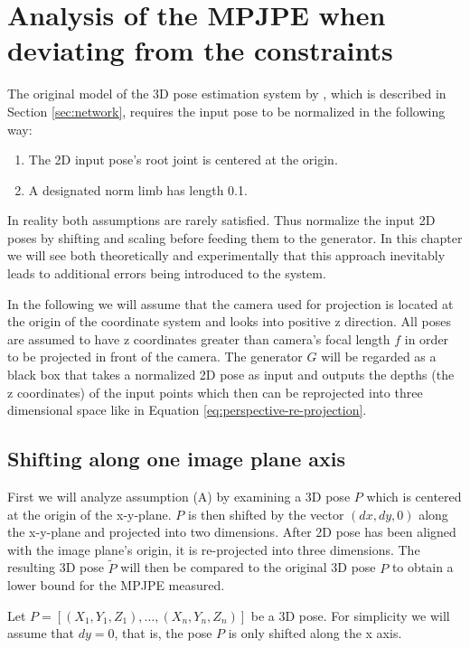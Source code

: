 \section{Analysis of the MPJPE when deviating from the constraints}

The original model of the 3D pose estimation system by \citet{drover18}, which is described in Section \ref{sec:network}, requires the input pose to be normalized in the following way:
\begin{enumerate}[label=(\Alph*)]
	\item The 2D input pose's root joint is centered at the origin.
	\item A designated norm limb has length 0.1.
\end{enumerate}

In reality both assumptions are rarely satisfied.
Thus \citet{drover18} normalize the input 2D poses by shifting and scaling before feeding them to the generator.
In this chapter we will see both theoretically and experimentally that this approach inevitably leads to additional errors being introduced to the system.


In the following we will assume that the camera used for projection is located at the origin of the coordinate system and looks into positive z direction.
All poses are assumed to have z coordinates greater than camera's focal length $f$ in order to be projected in front of the camera.
The generator $G$ will be regarded as a black box that takes a normalized 2D pose as input and outputs the depths (the z coordinates) of the input points which then can be reprojected into three dimensional space like in Equation \eqref{eq:perspective-re-projection}.

\subsection{Shifting along one image plane axis}
\label{sec:x-shift-error}
First we will analyze assumption (A) by examining a 3D pose $P$ which is centered at the origin of the x-y-plane.
$P$ is then shifted by the vector $(dx, dy, 0)$ along the x-y-plane and projected into two dimensions.
After 2D pose has been aligned with the image plane's origin, it is re-projected into three dimensions.
The resulting 3D pose $\widetilde{P}$ will then be compared to the original 3D pose $P$ to obtain a lower bound for the MPJPE measured.

Let $P = [(X_1, Y_1, Z_1), \dotsc, (X_n, Y_n, Z_n)]$ be a 3D pose.
For simplicity we will assume that $dy = 0$, that is, the pose $P$ is only shifted along the x axis.

